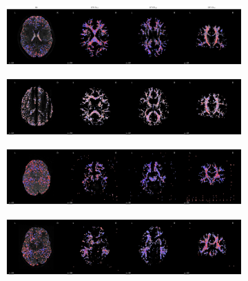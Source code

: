 \documentclass[9pt,lineno]{elife}
\begin{document}
\begin{figure}[tbp]
\begin{fullwidth}
    \centering
    \begin{subfigure}{\dimexpr\linewidth-3.5em\relax}
    \centering
    \includegraphics[width=\linewidth]{deep-learning-qc/attribution-maps-true-pos.pdf}
    \end{subfigure}
    \begin{subfigure}{\dimexpr\linewidth-3.5em\relax}
    \centering
    \includegraphics[width=\linewidth]{deep-learning-qc/attribution-maps-true-neg.pdf}
    \end{subfigure}
    \begin{subfigure}{\dimexpr\linewidth-3.5em\relax}
    \centering
    \includegraphics[width=\linewidth]{deep-learning-qc/attribution-maps-false-pos.pdf}
    \end{subfigure}
    \begin{subfigure}{\dimexpr\linewidth-3.5em\relax}
    \centering
    \includegraphics[width=\linewidth]{deep-learning-qc/attribution-maps-false-neg.pdf}

\end{subfigure}
\end{fullwidth}
\end{figure}
\end{document}
